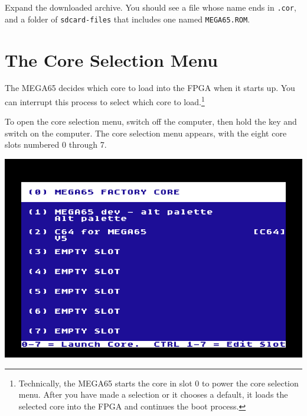 \begin{center}
\end{center}

Expand the downloaded archive. You should see a file whose name ends in {\tt .cor}, and a folder of {\tt sdcard-files} that includes one named {\tt MEGA65.ROM}.

\section{The Core Selection Menu}

The MEGA65 decides which core to load into the FPGA when it starts up. You can interrupt this process to select which core to load.\footnote{Technically, the MEGA65 starts the core in slot 0 to power the core selection menu. After you have made a selection or it chooses a default, it loads the selected core into the FPGA and continues the boot process.}

To open the core selection menu, switch off the computer, then hold the  key and switch on the computer. The core selection menu appears, with the eight core slots numbered 0 through 7.

\begin{center}
  \includegraphics[width=0.7\linewidth]{images/ss-flashmenu.png}
\end{center}

